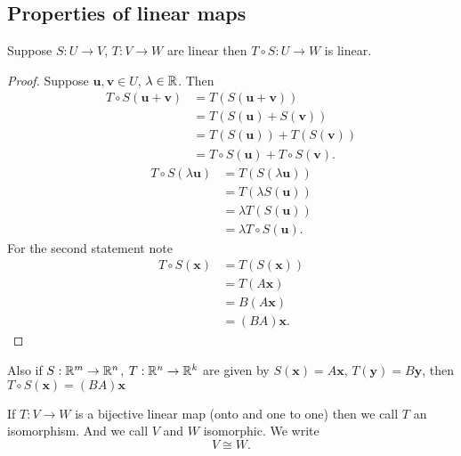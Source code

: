 \documentclass[10pt, a4paper]{article}
\newcommand{\mbf}[1]{\mathbf{#1}}
\begin{document}
\subsection{Properties of linear maps}

\begin{lemma}
    Suppose $S : U \rightarrow V$,
    $T : V \rightarrow W$ are linear then $T \circ S : U \rightarrow W$ is linear.
    \begin{proof}
        Suppose $\mbf{u, v} \in U$,
        $\lambda \in \mathbb{R}$.
        Then
        \begin{align*}
            T \circ S(\mbf{u + v}) &= T(S(\mbf{u + v})) \\
            &= T(S(\mbf{u}) + S(\mbf{v})) \\
            &= T(S(\mbf{u})) + T(S(\mbf{v})) \\
            &= T \circ S(\mbf{u}) + T \circ S(\mbf{v}).
        \end{align*}
        \begin{align*}
            T \circ S(\lambda\mbf{u}) &= T(S(\lambda\mbf{u})) \\
            &= T(\lambda S(\mbf{u})) \\
            &= \lambda T(S(\mbf{u})) \\
            &= \lambda T \circ S(\mbf{u}).
        \end{align*}
        For the second statement note
        \begin{align*}
            T \circ S(\mbf{x}) &= T(S(\mbf{x})) \\
            &= T(A\mbf{x}) \\
            &= B(A\mbf{x}) \\
            &= (BA)\mbf{x}.
        \end{align*}
    \end{proof}
\end{lemma}

Also if $S : \mathbb{R} ^ m \rightarrow \mathbb{R} ^ n$,
$T : \mathbb{R} ^ n \rightarrow \mathbb{R} ^ k$ are given by $S(\mbf{x}) = A\mbf{x}$,
$T(\mbf{y}) = B\mbf{y}$,
then $T \circ S(\mbf{x}) = (BA)\mbf{x}$

\begin{definition}[Isomorphism]
    If $T : V \rightarrow W$ is a bijective linear map
    (onto and one to one)
    then we call $T$ an isomorphism.
    And we call $V$ and $W$ isomorphic.
    We write
    \[
    V \cong W.
    \]
\end{definition}
\end{document}
